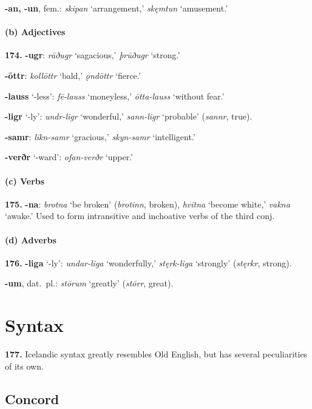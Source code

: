\documentclass[12pt,letterpaper]{book}
\newcommand{\gap}[1][.25in]{\hspace{#1}}
\newcommand\emptypage{\clearpage{\pagestyle{empty}\cleardoublepage}}
\begin{document}
\gap\textbf{-an, -un}, fem.: \textit{skipan} `arrangement,' \textit{skęmtun}
`amusement.'

\subsubsection{(b) Adjectives}

\textbf{174.} \textbf{-ugr}: \textit{rāðugr} `sagacious,' \textit{þrūðugr} `strong.'

\gap\textbf{-ōttr}: \textit{kollōttr} `bald,' \textit{ǫndōttr} `fierce.'

\gap\textbf{-lauss} `-less': \textit{fē-lauss} `moneyless,' \textit{ōtta-lauss}
`without fear.'

\gap\textbf{-ligr} `-ly': \textit{undr-ligr} `wonderful,' \textit{sann-ligr}
`probable' (\textit{sannr}, true).

\gap\textbf{-samr}: \textit{līkn-samr} `gracious,' \textit{skyn-samr} `intelligent.'

\gap\textbf{-verðr} `-ward': \textit{ofan-verðr} `upper.'

\subsubsection{(c) Verbs}

\textbf{175.} \textbf{-na}: \textit{brotna} `be broken' (\textit{brotinn}, broken),
\textit{hvītna} `become white,' \textit{vakna} `awake.'  Used to form
intransitive and inchoative verbs of the third conj.

\subsubsection{(d) Adverbs}

\textbf{176.} \textbf{-liga} `-ly': \textit{undar-liga} `wonderfully,' \textit{stęrk-liga}
`strongly' (\textit{stęrkr}, strong).

\gap\textbf{-um}, dat.\ pl.: \textit{stōrum} `greatly' (\textit{stōrr}, great).

\emptypage

\chapter{Syntax}

\textbf{177.} Icelandic syntax greatly resembles Old English, but has
several peculiarities of its own.

\section{Concord}
\end{document}
